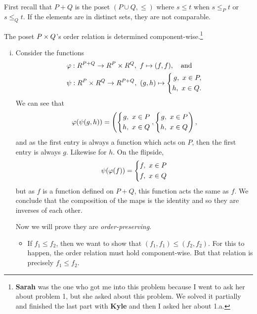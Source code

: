 \documentclass[12pt]{memoir}
\begin{document}
First recall that $P+Q$ is the poset $(P\cup Q,\leq)$ where $s\leq t$ when $s\leq_P t$ or $s\leq_Q t$. If the elements are in distinct sets, they are not comparable.\par 
The poset $P\times Q$'s order relation is determined component-wise.\footnote{\textbf{Sarah} was the one who got me into this problem because I went to ask her about problem 1, but she asked about this problem. We solved it partially and finished the last part with \textbf{Kyle} and then I asked her about 1.a.}

\begin{ptcbr}
\begin{enumerate}[i)]
    \itemsep=-0.4em
    \item Consider the functions 
    \begin{align*}
        &\vf: R^{P+Q}\to R^P\x R^Q,\ f\mapsto (f,f),\word{and}\\
        &\psi: R^P\x R^Q\to R^{P+Q},\ (g,h)\mapsto\left\lbrace\begin{aligned}
            g,\ x\in P,\\
            h,\ x\in Q.
        \end{aligned}\right.
    \end{align*}
    We can see that 
    $$\varphi(\psi(g,h))=\left(\left\lbrace\begin{aligned}
        g,\ x\in P\\
        h,\ x\in Q
    \end{aligned}\right.,\left\lbrace\begin{aligned}
        g,\ x\in P\\
        h,\ x\in Q
    \end{aligned}\right.\right),$$
    and as the first entry is always a function which acts on $P$, then the first entry is always $g$. Likewise for $h$. On the flipside, 
    $$\psi(\varphi(f))=\left\lbrace\begin{aligned}
        f,\ x\in P\\
        f,\ x\in Q
    \end{aligned}\right.$$
    but as $f$ is a function defined on $P+Q$, this function acts the same as $f$. We conclude that the composition of the maps is the identity and so they are inverses of each other.\par 
    Now we will prove they are \emph{order-preserving}. 
    \begin{itemize}
        \itemsep=-0.4em 
        \item If $f_1\leq f_2$, then we want to show that $(f_1,f_1)\leq(f_2,f_2)$. For this to happen, the order relation must hold component-wise. But that relation is precisely $f_1\leq f_2$. 

\end{itemize}
\end{enumerate}
\end{ptcbr}
\end{document}
